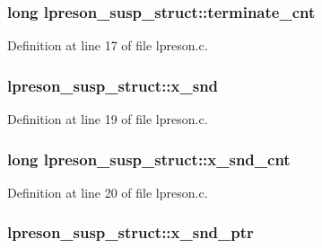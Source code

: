 \subsubsection[{\texorpdfstring{terminate\+\_\+cnt}{terminate_cnt}}]{\setlength{\rightskip}{0pt plus 5cm}long lpreson\+\_\+susp\+\_\+struct\+::terminate\+\_\+cnt}\hypertarget{structlpreson__susp__struct_aaadce34798755924d5fcabf6a86b236f}{}\label{structlpreson__susp__struct_aaadce34798755924d5fcabf6a86b236f}


Definition at line 17 of file lpreson.\+c.

\subsubsection[{\texorpdfstring{x\+\_\+snd}{x_snd}}]{ lpreson\+\_\+susp\+\_\+struct\+::x\+\_\+snd}\hypertarget{structlpreson__susp__struct_a6ceea729bec2304da39e80d905732fa2}{}\label{structlpreson__susp__struct_a6ceea729bec2304da39e80d905732fa2}


Definition at line 19 of file lpreson.\+c.

\subsubsection[{\texorpdfstring{x\+\_\+snd\+\_\+cnt}{x_snd_cnt}}]{\setlength{\rightskip}{0pt plus 5cm}long lpreson\+\_\+susp\+\_\+struct\+::x\+\_\+snd\+\_\+cnt}\hypertarget{structlpreson__susp__struct_a5a80949a81b546fb277a53ea7b407db2}{}\label{structlpreson__susp__struct_a5a80949a81b546fb277a53ea7b407db2}


Definition at line 20 of file lpreson.\+c.

\subsubsection[{\texorpdfstring{x\+\_\+snd\+\_\+ptr}{x_snd_ptr}}]{ lpreson\+\_\+susp\+\_\+struct\+::x\+\_\+snd\+\_\+ptr}\hypertarget{structlpreson__susp__struct_a55af26503932fc5a89fe5785e5638065}{}\label{structlpreson__susp__struct_a55af26503932fc5a89fe5785e5638065}


